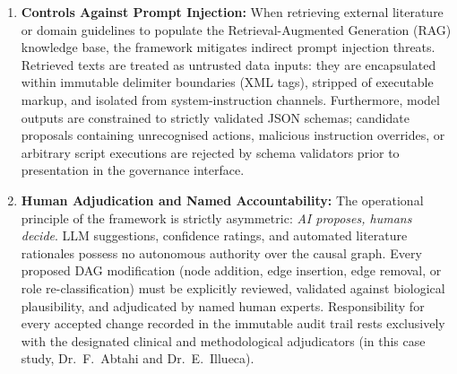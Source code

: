 \begin{enumerate}
    \item \textbf{Controls Against Prompt Injection:} When retrieving external literature or domain guidelines to populate the Retrieval-Augmented Generation (RAG) knowledge base, the framework mitigates indirect prompt injection threats. Retrieved texts are treated as untrusted data inputs: they are encapsulated within immutable delimiter boundaries (XML tags), stripped of executable markup, and isolated from system-instruction channels. Furthermore, model outputs are constrained to strictly validated JSON schemas; candidate proposals containing unrecognised actions, malicious instruction overrides, or arbitrary script executions are rejected by schema validators prior to presentation in the governance interface.
    
    \item \textbf{Human Adjudication and Named Accountability:} The operational principle of the framework is strictly asymmetric: \textit{AI proposes, humans decide}. LLM suggestions, confidence ratings, and automated literature rationales possess no autonomous authority over the causal graph. Every proposed DAG modification (node addition, edge insertion, edge removal, or role re-classification) must be explicitly reviewed, validated against biological plausibility, and adjudicated by named human experts. Responsibility for every accepted change recorded in the immutable audit trail rests exclusively with the designated clinical and methodological adjudicators (in this case study, Dr.~F.~Abtahi and Dr.~E.~Illueca).
\end{enumerate}
